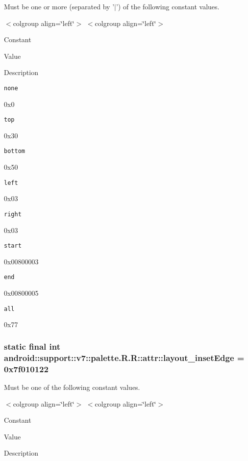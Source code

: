 Must be one or more (separated by '$|$') of the following constant values. \begin{TabularC}{0}
\hline
\end{TabularC}
$<$colgroup align=\char`\"{}left\char`\"{}$>$ $<$colgroup align=\char`\"{}left\char`\"{}$>$ 

Constant

Value

Description 

{\tt none}

0x0

{\tt top}

0x30

{\tt bottom}

0x50

{\tt left}

0x03

{\tt right}

0x03

{\tt start}

0x00800003

{\tt end}

0x00800005

{\tt all}

0x77\hypertarget{classandroid_1_1support_1_1v7_1_1palette_1_1_r_1_1attr_d9005fdc66c379541013482654bc5927}{
\subsubsection[{layout\_\-insetEdge}]{\setlength{\rightskip}{0pt plus 5cm}static final int android::support::v7::palette.R.R::attr::layout\_\-insetEdge = 0x7f010122}}
\label{classandroid_1_1support_1_1v7_1_1palette_1_1_r_1_1attr_d9005fdc66c379541013482654bc5927}


Must be one of the following constant values. \begin{TabularC}{0}
\hline
\end{TabularC}
$<$colgroup align=\char`\"{}left\char`\"{}$>$ $<$colgroup align=\char`\"{}left\char`\"{}$>$ 

Constant

Value

Description 

